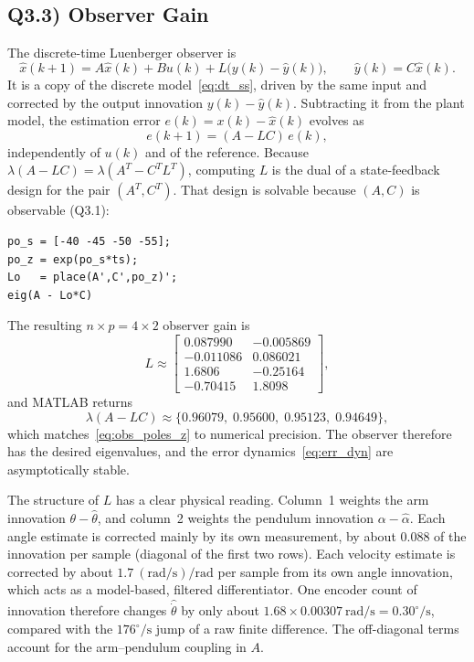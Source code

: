 \documentclass[11pt,a4paper]{article}
\begin{document}
\subsection*{Q3.3) Observer Gain}
The discrete-time Luenberger observer is
\begin{equation}\label{eq:observer}
  \hat{x}(k+1)=A\hat{x}(k)+Bu(k)+L\bigl(y(k)-\hat{y}(k)\bigr),
  \qquad \hat{y}(k)=C\hat{x}(k).
\end{equation}
It is a copy of the discrete model~\eqref{eq:dt_ss}, driven by the same input
and corrected by the output innovation $y(k)-\hat y(k)$. Subtracting it from
the plant model, the estimation error $e(k)=x(k)-\hat{x}(k)$ evolves as
\begin{equation}\label{eq:err_dyn}
  e(k+1)=(A-LC)\,e(k),
\end{equation}
independently of $u(k)$ and of the reference. Because
$\lambda(A-LC)=\lambda(A^{T}-C^{T}L^{T})$, computing $L$ is the dual of a
state-feedback design for the pair $(A^{T},C^{T})$. That design is solvable
because $(A,C)$ is observable (Q3.1):
\begin{verbatim}
po_s = [-40 -45 -50 -55];
po_z = exp(po_s*ts);
Lo   = place(A',C',po_z)';
eig(A - Lo*C)
\end{verbatim}
The resulting $n\times p=4\times2$ observer gain is
\begin{equation}\label{eq:L}
  L\approx
  \begin{bmatrix}
     0.087990 & -0.005869\\
    -0.011086 &  0.086021\\
     1.6806   & -0.25164\\
    -0.70415  &  1.8098
  \end{bmatrix},
\end{equation}
and MATLAB returns
\begin{equation}
  \lambda(A-LC)\approx\{0.96079,\;0.95600,\;0.95123,\;0.94649\},
\end{equation}
which matches~\eqref{eq:obs_poles_z} to numerical precision. The observer
therefore has the desired eigenvalues, and the error dynamics~\eqref{eq:err_dyn}
are asymptotically stable.

The structure of $L$ has a clear physical reading. Column~1 weights the arm
innovation $\theta-\hat\theta$, and column~2 weights the pendulum innovation
$\alpha-\hat\alpha$. Each angle estimate is corrected mainly by its own
measurement, by about $0.088$ of the innovation per sample (diagonal of the
first two rows). Each velocity estimate is corrected by about
$1.7~\mathrm{(rad/s)/rad}$ per sample from its own angle innovation, which
acts as a model-based, filtered differentiator. One encoder count of
innovation therefore changes $\hat{\dot\theta}$ by only about
$1.68\times0.00307~\mathrm{rad/s}=0.30^\circ/\mathrm s$, compared with the
$176^\circ/\mathrm s$ jump of a raw finite difference. The off-diagonal terms
account for the arm--pendulum coupling in $A$.
\end{document}
